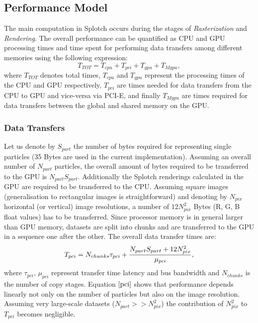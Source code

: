 \documentclass[smallextended]{svjour3}
\begin{document}
\subsection{Performance Model}
\label{sec:model}

The main computation in Splotch occurs during the stages of {\it Rasterization} and {\it Rendering}.
The overall performance can be quantified as CPU and GPU processing times 
and time spent for performing data transfers among different memories using the following expression:
\begin{equation}\label{Ts}
T_{TOT} = T_{cpu} + T_{pci} + T_{gpu} + T_{Mgpu},
\end{equation}
where $T_{TOT}$ denotes total times, 
$T_{cpu}$ and $T_{gpu}$ represent the processing times of the CPU and GPU respectively, $T_{pci}$ are times needed for data transfers from the CPU to GPU and vice-versa via PCI-E, and finally $T_{Mgpu}$ are times required for data transfers between the global and shared memory on the GPU. 

\subsubsection{Data Transfers}
Let us denote by $S_{part}$ the number of bytes required for representing single particles (35 Bytes are used in the current implementation). Assuming an overall number of $N_{part}$ particles, the overall amount of bytes required to be transferred to the GPU is $N_{part} S_{part}$. Additionally the Splotch renderings calculated in the GPU are required to be transferred to the CPU. Assuming square images (generalisation to rectangular images is straightforward) and denoting by $N_{pix}$ horizontal (or vertical) image resolutions, a number of $12 N_{pix}^2$ Bytes (R, G, B float values) has to be transferred. 
Since processor memory is in general larger than GPU memory,
datasets are split into chunks and are transferred to the GPU in a sequence one after the other. The overall data transfer times are:
\begin{equation}\label{pci}
T_{pci} =  N_{chunks} \tau_{pci} + {N_{part} S_{part} + 12 N_{pix}^2 \over 
\mu_{pci}},
\end{equation}
where $\tau_{pci}$, $\mu_{pci}$ represent transfer time latency and bus bandwidth and $N_{chunks}$ is the number of copy stages. Equation $\eqref{pci}$ shows that performance depends linearly not only on the number of particles but also on the image resolution. Assuming very large-scale datasets ($N_{part} >> N_{pix}^2$) the contribution of $N_{pix}^2$ to $T_{pci}$ becomes negligible. 
 
\end{document}
